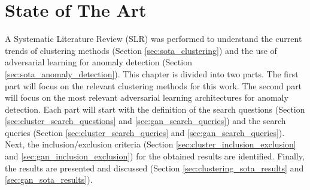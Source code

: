 \chapter{State of The Art} \label{chap:sota}



A Systematic Literature Review (SLR) was performed to understand the current trends of clustering methods (Section \ref{sec:sota_clustering}) and the use of adversarial learning for anomaly detection (Section \ref{sec:sota_anomaly_detection}). This chapter is divided into two parts. The first part will focus on the relevant clustering methods for this work. The second part will focus on the most relevant adversarial learning architectures for anomaly detection. Each part will start with the definition of the search questions (Section \ref{sec:cluster_search_questions} and \ref{sec:gan_search_queries}) and the search queries (Section \ref{sec:cluster_search_queries} and \ref{sec:gan_search_queries}). Next, the inclusion/exclusion criteria (Section \ref{sec:cluster_inclusion_exclusion} and \ref{sec:gan_inclusion_exclusion}) for the obtained results are identified. Finally, the results are presented and discussed (Section \ref{sec:clustering_sota_results} and \ref{sec:gan_sota_results}).


